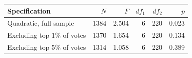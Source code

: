 \begin{tabular}{lrrrrr}
\toprule
Specification & $N$ & $F$ & $df_1$ & $df_2$ & $p$ \\
\midrule
Quadratic, full sample & 1384 & 2.504 & 6 & 220 & 0.023 \\
Excluding top 1\% of votes & 1370 & 1.654 & 6 & 220 & 0.134 \\
Excluding top 5\% of votes & 1314 & 1.058 & 6 & 220 & 0.389 \\
\bottomrule
\end{tabular}
